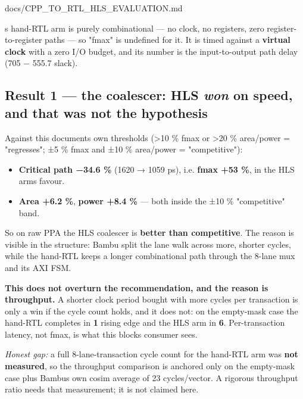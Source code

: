 \begin{relocated}{docs/CPP_TO_RTL_HLS_EVALUATION.md}
\begin{landscape}
\end{landscape}

\textquotesingle s hand-RTL arm is purely
combinational --- no clock, no registers, zero register-to-register
paths --- so "fmax" is undefined for it. It is timed against a
\textbf{virtual clock} with a zero I/O budget, and its number is the
input-to-output path delay (705 − 555.7 slack).

\subsection{\texorpdfstring{Result 1 --- the coalescer: HLS \emph{won}
on speed, and that was not the
hypothesis}{Result 1 --- the coalescer: HLS won on speed, and that was not the hypothesis}}\label{tm:dec:cpp-to-rtl-hls-evaluation:result-1-the-coalescer-hls-won-on-speed-and-that-was-not-the-hypothesis}

Against this document\textquotesingle s own thresholds (\textgreater10
\% fmax or \textgreater20 \% area/\allowbreak{}power = "regresses"; ±5
\% fmax and ±10 \% area/\allowbreak{}power = "competitive"):

\begin{itemize}
\tightlist
\item
  \textbf{Critical path −34.6 \%} (1620 → 1059 ps), i.e. \textbf{fmax
  +53 \%}, in the HLS arm\textquotesingle s favour.
\item
  \textbf{Area +6.2 \%}, \textbf{power +8.4 \%} --- both inside the ±10
  \% "competitive" band.
\end{itemize}

So on raw PPA the HLS coalescer is \textbf{better than competitive}. The
reason is visible in the structure: Bambu split the lane walk across
more, shorter cycles, while the hand-RTL keeps a longer combinational
path through the 8-lane mux and its AXI FSM.

\textbf{This does not overturn the recommendation, and the reason is
throughput.} A shorter clock period bought with more cycles per
transaction is only a win if the cycle count holds, and it does not: on
the empty-mask case the hand-RTL completes in \textbf{1} rising edge and
the HLS arm in \textbf{6}. Per-transaction latency, not fmax, is what
this block\textquotesingle s consumer sees.

\emph{Honest gap:} a full 8-lane-transaction cycle count for the
hand-RTL arm was \textbf{not measured}, so the throughput comparison is
anchored only on the empty-mask case plus Bambu\textquotesingle s own
cosim average of 23 cycles/\allowbreak{}vector. A rigorous throughput
ratio needs that measurement; it is not claimed here.


\end{relocated}
